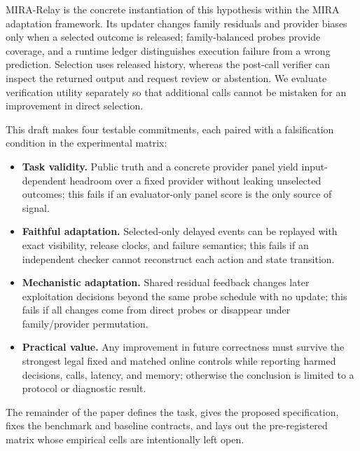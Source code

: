\documentclass[sigconf,anonymous]{aamas}
\begin{document}
MIRA-Relay is the concrete instantiation of this hypothesis within the MIRA adaptation framework. Its updater changes family residuals and provider biases only when a selected outcome is released; family-balanced probes provide coverage, and a runtime ledger distinguishes execution failure from a wrong prediction. Selection uses released history, whereas the post-call verifier can inspect the returned output and request review or abstention. We evaluate verification utility separately so that additional calls cannot be mistaken for an improvement in direct selection.

This draft makes four testable commitments, each paired with a falsification condition in the experimental matrix:
\begin{itemize}[leftmargin=*,itemsep=1pt,topsep=2pt]
    \item \textbf{Task validity.} Public truth and a concrete provider panel yield input-dependent headroom over a fixed provider without leaking unselected outcomes; this fails if an evaluator-only panel score is the only source of signal.
    \item \textbf{Faithful adaptation.} Selected-only delayed events can be replayed with exact visibility, release clocks, and failure semantics; this fails if an independent checker cannot reconstruct each action and state transition.
    \item \textbf{Mechanistic adaptation.} Shared residual feedback changes later exploitation decisions beyond the same probe schedule with no update; this fails if all changes come from direct probes or disappear under family/provider permutation.
    \item \textbf{Practical value.} Any improvement in future correctness must survive the strongest legal fixed and matched online controls while reporting harmed decisions, calls, latency, and memory; otherwise the conclusion is limited to a protocol or diagnostic result.
\end{itemize}
The remainder of the paper defines the task, gives the proposed specification, fixes the benchmark and baseline contracts, and lays out the pre-registered matrix whose empirical cells are intentionally left open.
\end{document}
